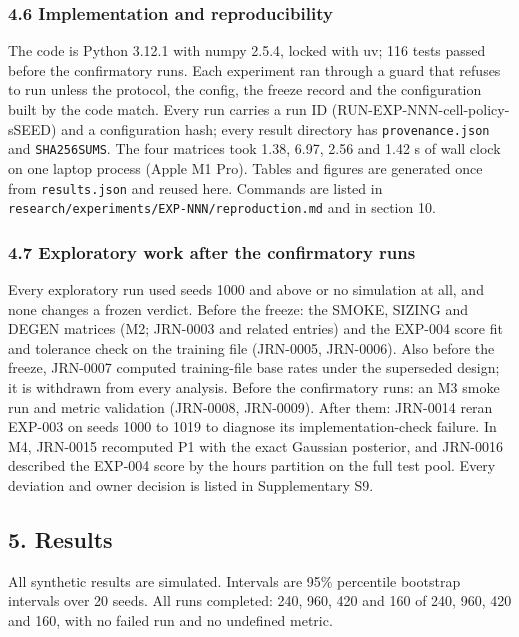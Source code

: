 \documentclass[
]{article}
\begin{document}
\subsubsection{4.6 Implementation and
reproducibility}\label{implementation-and-reproducibility}

The code is Python 3.12.1 with numpy 2.5.4, locked with uv; 116 tests
passed before the confirmatory runs. Each experiment ran through a guard
that refuses to run unless the protocol, the config, the freeze record
and the configuration built by the code match. Every run carries a run
ID (RUN-EXP-NNN-cell-policy-sSEED) and a configuration hash; every
result directory has \texttt{provenance.json} and \texttt{SHA256SUMS}.
The four matrices took 1.38, 6.97, 2.56 and 1.42 s of wall clock on one
laptop process (Apple M1 Pro). Tables and figures are generated once
from \texttt{results.json} and reused here. Commands are listed in
\texttt{research/experiments/EXP-NNN/reproduction.md} and in section 10.

\subsubsection{4.7 Exploratory work after the confirmatory
runs}\label{exploratory-work-after-the-confirmatory-runs}

Every exploratory run used seeds 1000 and above or no simulation at all,
and none changes a frozen verdict. Before the freeze: the SMOKE, SIZING
and DEGEN matrices (M2; JRN-0003 and related entries) and the EXP-004
score fit and tolerance check on the training file (JRN-0005, JRN-0006).
Also before the freeze, JRN-0007 computed training-file base rates under
the superseded design; it is withdrawn from every analysis. Before the
confirmatory runs: an M3 smoke run and metric validation (JRN-0008,
JRN-0009). After them: JRN-0014 reran EXP-003 on seeds 1000 to 1019 to
diagnose its implementation-check failure. In M4, JRN-0015 recomputed P1
with the exact Gaussian posterior, and JRN-0016 described the EXP-004
score by the hours partition on the full test pool. Every deviation and
owner decision is listed in Supplementary S9.

\subsection{5. Results}\label{results}

All synthetic results are simulated. Intervals are 95\% percentile
bootstrap intervals over 20 seeds. All runs completed: 240, 960, 420 and
160 of 240, 960, 420 and 160, with no failed run and no undefined
metric.
\end{document}
